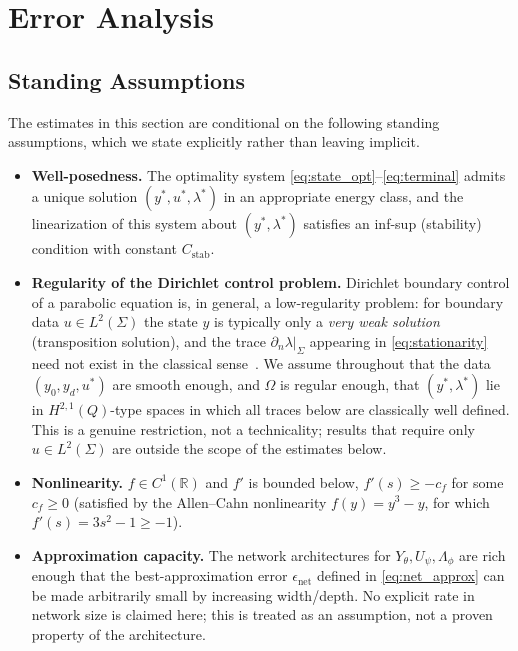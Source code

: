 \section{Error Analysis}
\label{sec:error-analysis}

\subsection{Standing Assumptions}
\label{sec:standing-assumptions}

The estimates in this section are conditional on the following standing assumptions, which we state explicitly rather than leaving implicit.

\begin{itemize}
\item[(A1)] \textbf{Well-posedness.} The optimality system \eqref{eq:state_opt}--\eqref{eq:terminal} admits a unique solution $(y^*,u^*,\lambda^*)$ in an appropriate energy class, and the linearization of this system about $(y^*,\lambda^*)$ satisfies an inf-sup (stability) condition with constant $C_{\text{stab}}$.
\item[(A2)] \textbf{Regularity of the Dirichlet control problem.} Dirichlet boundary control of a parabolic equation is, in general, a low-regularity problem: for boundary data $u\in L^2(\Sigma)$ the state $y$ is typically only a \emph{very weak solution} (transposition solution), and the trace $\partial_n\lambda|_\Sigma$ appearing in \eqref{eq:stationarity} need not exist in the classical sense~\cite{lasiecka2000control,troltzsch2010optimal}. We assume throughout that the data $(y_0, y_d, u^*)$ are smooth enough, and $\Omega$ is regular enough, that $(y^*,\lambda^*)$ lie in $H^{2,1}(Q)$-type spaces in which all traces below are classically well defined. This is a genuine restriction, not a technicality; results that require only $u \in L^2(\Sigma)$ are outside the scope of the estimates below.
\item[(A3)] \textbf{Nonlinearity.} $f\in C^1(\mathbb{R})$ and $f'$ is bounded below, $f'(s)\geq -c_f$ for some $c_f\geq 0$ (satisfied by the Allen--Cahn nonlinearity $f(y)=y^3-y$, for which $f'(s) = 3s^2-1 \geq -1$).
\item[(A4)] \textbf{Approximation capacity.} The network architectures for $Y_\theta, U_\psi, \Lambda_\phi$ are rich enough that the best-approximation error $\epsilon_{\text{net}}$ defined in \eqref{eq:net_approx} can be made arbitrarily small by increasing width/depth. No explicit rate in network size is claimed here; this is treated as an assumption, not a proven property of the architecture.
\end{itemize}

